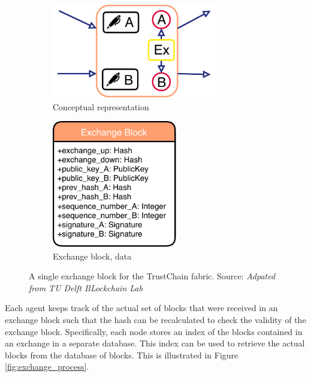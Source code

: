 \begin{figure}
    \centering
    \begin{subfigure}{0.49\textwidth}
        \centering
        \includegraphics[width=0.8\textwidth]{images/exchange_block.pdf}
        \caption{Conceptual representation}
        \label{fig:exchange_block_conceptual}
    \end{subfigure}
    \begin{subfigure}{0.49\textwidth}
        \centering
        \includegraphics[width=0.6\textwidth]{images/exchange_block_data.pdf}
        \caption{Exchange block, data}
        \label{fig:exchange_block_data}
    \end{subfigure}
    \caption{A single exchange block for the TrustChain fabric. Source: \textit{Adpated from TU Delft BLockchain Lab}}
    \label{fig:exchange_block}
\end{figure}

Each agent keeps track of the actual set of blocks that were received in an exchange block such that 
the hash can be recalculated to check the validity of the exchange block. Specifically, each 
node stores an index of the blocks contained in an exchange in a separate database. This index can be 
used to retrieve the actual blocks from the database of blocks. This is illustrated in Figure \ref{fig:exchange_process}.


